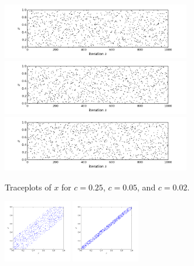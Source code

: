 \documentclass[12pt]{article}
\begin{document}
\begin{figure}
    \centering
    \begin{subfigure}[t]{1\textwidth}
        \centering
            \includegraphics[trim=0 0.4cm 0 0, clip, width=0.9\textwidth]{code/box-x_trace-c=0.25-transformed.png}
            \includegraphics[trim=0 0.4cm 0 0, clip, width=0.9\textwidth]{code/box-x_trace-c=0.05-transformed.png}
            \includegraphics[trim=0 0.4cm 0 0, clip, width=0.9\textwidth]{code/box-x_trace-c=0.02-transformed.png}
        \caption{Traceplots of $x$ for $c = 0.25$, $c = 0.05$, and $c = 0.02$.}
    \end{subfigure}
    \begin{subfigure}[t]{1\textwidth}
        \centering
            \includegraphics[trim=0.8cm 0.4cm 0.8cm 0, clip, width=0.325\textwidth]{code/box-scatter-c=0.25-transformed.png}
            \includegraphics[trim=0.8cm 0.4cm 0.8cm 0, clip, width=0.325\textwidth]{code/box-scatter-c=0.05-transformed.png}

\end{subfigure}
\end{figure}
\end{document}
